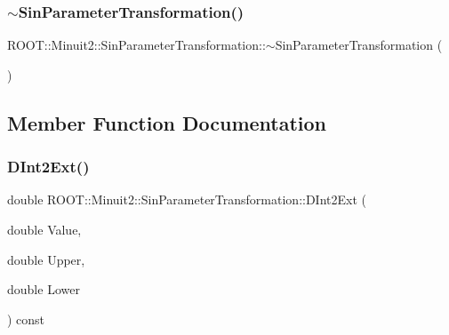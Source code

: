 \subsubsection{\texorpdfstring{$\sim$SinParameterTransformation()}{~SinParameterTransformation()}\hspace{0.1cm}{\footnotesize\ttfamily [3/3]}}
{\footnotesize\ttfamily R\+O\+O\+T\+::\+Minuit2\+::\+Sin\+Parameter\+Transformation\+::$\sim$\+Sin\+Parameter\+Transformation (\begin{DoxyParamCaption}{ }\end{DoxyParamCaption})\hspace{0.3cm}{\ttfamily [inline]}}



\subsection{Member Function Documentation}
\mbox{\label{classROOT_1_1Minuit2_1_1SinParameterTransformation_a4335749e9dd572c2234a8a119893e3fd}} 
\subsubsection{\texorpdfstring{DInt2Ext()}{DInt2Ext()}\hspace{0.1cm}{\footnotesize\ttfamily [1/3]}}
{\footnotesize\ttfamily double R\+O\+O\+T\+::\+Minuit2\+::\+Sin\+Parameter\+Transformation\+::\+D\+Int2\+Ext (\begin{DoxyParamCaption}\item[{double}]{Value,  }\item[{double}]{Upper,  }\item[{double}]{Lower }\end{DoxyParamCaption}) const}

